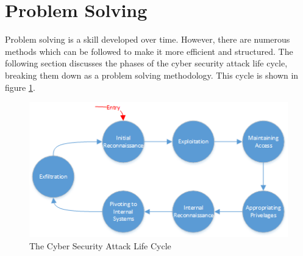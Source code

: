 	\section{Problem Solving}
		Problem solving is a skill developed over time. 
		However, there are numerous methods which can be followed to make it more efficient and structured. 
		The following section discusses the phases of the cyber security attack life cycle, breaking them down as a problem solving methodology\cite{APTMin,AttackLifeCycleAPTOverview}. 
		This cycle is shown in figure \ref{fig:CyberAttackLifeCycle}.
		\begin{figure}
			\centering
			\includegraphics[scale=0.8]{./AttackLifeCycle.png}
			\caption{The Cyber Security Attack Life Cycle}
			\label{fig:CyberAttackLifeCycle}
		\end{figure}
